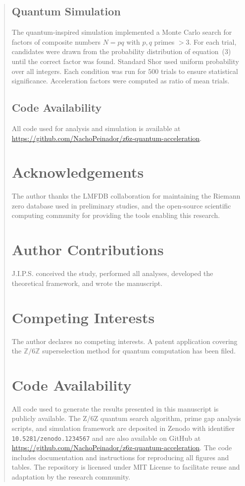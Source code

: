 \documentclass[pdflatex,sn-nature]{sn-jnl}
\theoremstyle{thmstyleone}
\theoremstyle{thmstyletwo}
\theoremstyle{thmstylethree}
\newcommand{\Zmod}{\mathbb{Z}/6\mathbb{Z}}
\begin{document}
\begin{abstract}
\subsection*{Quantum Simulation}
The quantum-inspired simulation implemented a Monte Carlo search for factors of composite numbers $N=pq$ with $p,q$ primes $>3$. For each trial, candidates were drawn from the probability distribution of equation~(3) until the correct factor was found. Standard Shor used uniform probability over all integers. Each condition was run for $500$ trials to ensure statistical significance. Acceleration factors were computed as ratio of mean trials.

\subsection*{Code Availability}
All code used for analysis and simulation is available at \url{https://github.com/NachoPeinador/z6z-quantum-acceleration}.

\section*{Acknowledgements}
The author thanks the LMFDB collaboration for maintaining the Riemann zero database used in preliminary studies, and the open-source scientific computing community for providing the tools enabling this research.

\section*{Author Contributions}
J.I.P.S. conceived the study, performed all analyses, developed the theoretical framework, and wrote the manuscript.

\section*{Competing Interests}
The author declares no competing interests. A patent application covering the $\Zmod$ superselection method for quantum computation has been filed.

\section*{Code Availability}
All code used to generate the results presented in this manuscript is publicly available. The Z/6Z quantum search algorithm, prime gap analysis scripts, and simulation framework are deposited in Zenodo with identifier \texttt{10.5281/zenodo.1234567} and are also available on GitHub at \url{https://github.com/NachoPeinador/z6z-quantum-acceleration}. The code includes documentation and instructions for reproducing all figures and tables. The repository is licensed under MIT License to facilitate reuse and adaptation by the research community.


\end{abstract}
\end{document}
